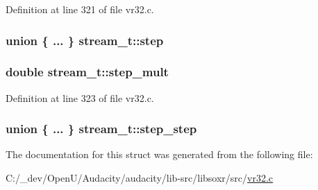 Definition at line 321 of file vr32.\+c.

\subsubsection[{\texorpdfstring{step}{step}}]{\setlength{\rightskip}{0pt plus 5cm}union \{ ... \}   stream\+\_\+t\+::step}\hypertarget{structstream__t_ae4376a6893b782ee289fdb923d7e7f72}{}\label{structstream__t_ae4376a6893b782ee289fdb923d7e7f72}
\subsubsection[{\texorpdfstring{step\+\_\+mult}{step_mult}}]{\setlength{\rightskip}{0pt plus 5cm}double stream\+\_\+t\+::step\+\_\+mult}\hypertarget{structstream__t_a024424a394246496630e76adfb2800ae}{}\label{structstream__t_a024424a394246496630e76adfb2800ae}


Definition at line 323 of file vr32.\+c.

\subsubsection[{\texorpdfstring{step\+\_\+step}{step_step}}]{\setlength{\rightskip}{0pt plus 5cm}union \{ ... \}   stream\+\_\+t\+::step\+\_\+step}\hypertarget{structstream__t_aecc99ea2d956e1540e44aac80a5caa05}{}\label{structstream__t_aecc99ea2d956e1540e44aac80a5caa05}


The documentation for this struct was generated from the following file\+:\begin{DoxyCompactItemize}
\item 
C\+:/\+\_\+dev/\+Open\+U/\+Audacity/audacity/lib-\/src/libsoxr/src/\hyperlink{vr32_8c}{vr32.\+c}\end{DoxyCompactItemize}
